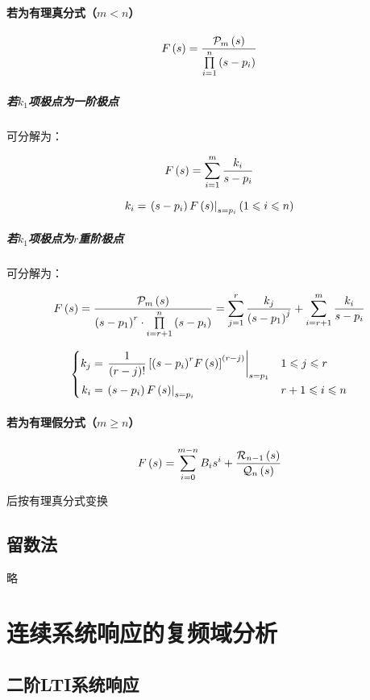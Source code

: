 \documentclass{article}
\begin{document}
\paragraph{若为有理真分式（$m<n$）}

\[F\left(s\right)=\frac{\mathcal P_m\left(s\right)}{\prod\limits_{i=1}^n\left(s-p_i\right)}\]

\subparagraph{若$k_1$项极点为一阶极点}

可分解为：

\[F\left(s\right)=\sum_{i=1}^m\frac{k_i}{s-p_i}\]

\[k_i=\left.\left(s-p_i\right)F\left(s\right)\right|_{s=p_i}\left(1\leqslant i\leqslant n\right)\]

\subparagraph{若$k_1$项极点为$r$重阶极点}

可分解为：

\[F\left(s\right)=\frac{\mathcal P_m\left(s\right)}{{\left(s-p_1\right)}^r\cdot\prod\limits_{i=r+1}^n\left(s-p_i\right)}
    =\sum_{j=1}^r\frac{k_j}{{\left(s-p_1\right)}^j}+\sum_{i=r+1}^m\frac{k_i}{s-p_i}\]

\[\left\{\begin{aligned}
        k_j & =\left.\frac1{\left(r-j\right)!}\left[{\left(s-p_i\right)}^rF\left(s\right)\right]^{\left(r-j\right)}\right|_{s=p_1} &  & 1\leqslant j\leqslant r   \\
        k_i & =\left.\left(s-p_i\right)F\left(s\right)\right|_{s=p_i}                                                  &  & r+1\leqslant i\leqslant n
    \end{aligned}\right.\]

\paragraph{若为有理假分式（$m\geqslant n$）}

\[F\left(s\right)=\sum_{i=0}^{m-n}B_is^i+\frac{\mathcal R_{n-1}\left(s\right)}{\mathcal Q_n\left(s\right)}\]

后按有理真分式变换

\subsection{留数法}

略

\section{连续系统响应的复频域分析}

\subsection{二阶LTI系统响应}
\end{document}
